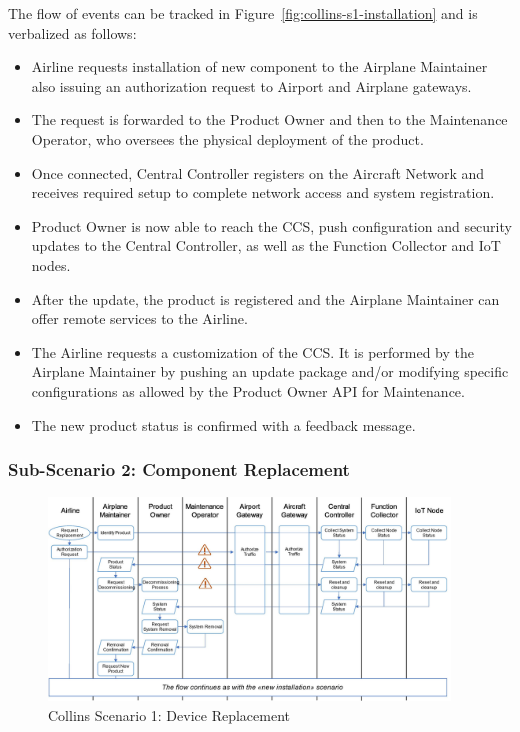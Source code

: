 The flow of events can be tracked in Figure~\ref{fig:collins-s1-installation} and is verbalized as follows:

\begin{itemize}
	\item Airline requests installation of new component to the Airplane Maintainer also issuing an authorization
	      request to Airport and Airplane gateways.
	\item The request is forwarded to the Product Owner and then to the Maintenance Operator, who oversees the
	      physical deployment of the product.
	\item Once connected, Central Controller registers on the Aircraft Network and receives required setup to
	      complete network access and system registration.
	\item Product Owner is now able to reach the CCS, push configuration and security updates to the Central
	      Controller, as well as the Function Collector and IoT nodes.
	\item After the update, the product is registered and the Airplane Maintainer can offer remote services to the
	      Airline.
	\item The Airline requests a customization of the CCS. It is performed by the Airplane Maintainer by pushing an
	      update package and/or modifying specific configurations as allowed by the Product Owner API for
	      Maintenance.
	\item The new product status is confirmed with a feedback message.
\end{itemize}

\subsubsection{Sub-Scenario 2: Component Replacement}

\begin{figure}
	\begin{center}
		\includegraphics[width=0.95\textwidth]{figures/collins-s1-replacement.jpg}
	\end{center}
	\caption{Collins Scenario 1: Device Replacement}
	\label{fig:collins-s1-replacement}
\end{figure}

